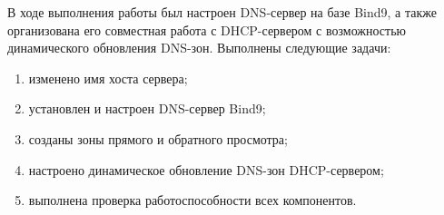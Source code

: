 \documentclass[a4paper,14pt,oneside,openany]{memoir}
\begin{document}
В ходе выполнения работы был настроен DNS-сервер на базе Bind9, а также организована его совместная работа с DHCP-сервером с возможностью динамического обновления DNS-зон. Выполнены следующие задачи:
\begin{enumerate}
    \item изменено имя хоста сервера;
    \item установлен и настроен DNS-сервер Bind9;
    \item созданы зоны прямого и обратного просмотра;
    \item настроено динамическое обновление DNS-зон DHCP-сервером;
    \item выполнена проверка работоспособности всех компонентов.
\end{enumerate}
\end{document}

